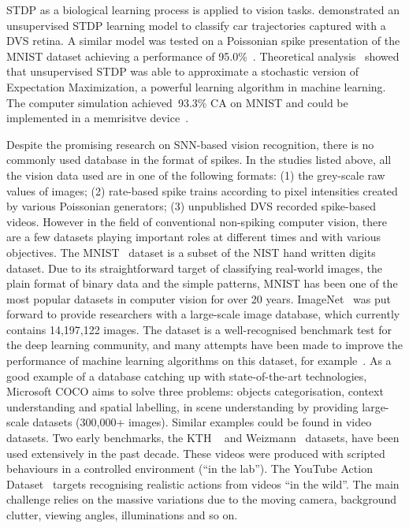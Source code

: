 \documentclass{frontiersENG} %
\begin{document}
STDP as a biological learning process is applied to vision tasks.
\cite{bichler2012extraction} demonstrated an unsupervised STDP learning model to classify car trajectories captured with a DVS retina. 
A similar model was tested on a Poissonian spike presentation of the MNIST dataset achieving a performance of 95.0\%~\citep{diehl2015unsupervised}.
Theoretical analysis~\citep{nessler2013bayesian} showed that unsupervised STDP was able to approximate a stochastic version of Expectation Maximization, a powerful learning algorithm in machine learning.
The computer simulation achieved~93.3\% CA on MNIST and could be implemented in a memrisitve device~\citep{bill2014compound}. 

Despite the promising research on SNN-based vision recognition, there is no commonly used database in the format of spikes.
In the studies listed above, all the vision data used are in one of the following formats:
(1) the grey-scale raw values of images;
(2) rate-based spike trains according to pixel intensities created by various Poissonian generators;
(3) unpublished DVS recorded spike-based videos.
However in the field of conventional non-spiking computer vision, there are a few datasets playing important roles at different times and with various objectives.
The MNIST~\citep{lecun1998gradient} dataset is a subset of the NIST hand written digits dataset.
Due to its straightforward target of classifying real-world images, the plain format of binary data and the simple patterns, MNIST has been one of the most popular datasets in computer vision for over 20 years.
ImageNet~\citep{deng2009imagenet} was put forward to provide researchers with a large-scale image database, which currently contains 14,197,122 images.
The dataset is a well-recognised benchmark test for the deep learning community, and many attempts have been made to improve the performance of machine learning algorithms on this dataset, for example~\citep{krizhevsky2012imagenet}.
As a good example of a database catching up with state-of-the-art technologies, Microsoft COCO aims to solve three problems: objects categorisation, context understanding and spatial labelling, in scene understanding by providing large-scale datasets (300,000+ images).
Similar examples could be found in video datasets.
Two early benchmarks, the KTH ~\citep{schuldt2004recognizing} and Weizmann~\citep{blank2005actions} datasets, have been used extensively in the past decade. 
These videos were produced with scripted behaviours in a controlled environment (``in the lab'').
The YouTube Action Dataset~\citep{liu2009recognizing} targets recognising realistic actions from videos ``in the wild''.
The main challenge relies on the massive variations due to the moving camera, background clutter, viewing angles, illuminations and so on.
\end{document}
